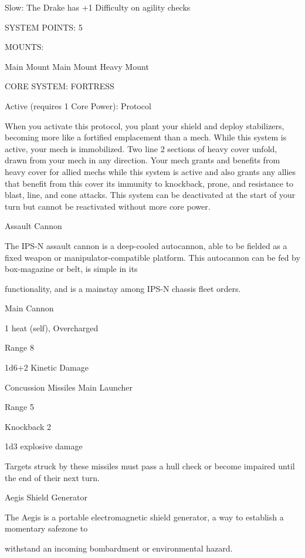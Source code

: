   Slow: The Drake has +1 Difficulty on agility checks

                                               SYSTEM POINTS: 5

                                                    MOUNTS:

  Main Mount                         Main Mount                              Heavy Mount

                                          CORE SYSTEM: FORTRESS

  Active (requires 1 Core Power):
  Protocol

  When you activate this protocol, you plant your shield and deploy stabilizers, becoming more like a
  fortified emplacement than a mech. While this system is active, your mech is immobilized. Two line 2
  sections of heavy cover unfold, drawn from your mech in any direction. Your mech grants and benefits
  from heavy cover for allied mechs while this system is active and also grants any allies that benefit from
  this cover its immunity to knockback, prone, and resistance to blast, line, and cone attacks. This
  system can be deactivated at the start of your turn but cannot be reactivated without more core power.

Assault Cannon

The IPS-N assault cannon is a deep-cooled autocannon, able to be fielded as a fixed weapon or
manipulator-compatible platform. This autocannon can be fed by box-magazine or belt, is simple in its

functionality, and is a mainstay among IPS-N chassis fleet orders.

Main Cannon

1 heat (self), Overcharged

Range 8

1d6+2 Kinetic Damage





Concussion Missiles
Main Launcher

Range 5

Knockback 2

1d3 explosive damage

Targets struck by these missiles must pass a hull check or become impaired until the end of their
next turn.


Aegis Shield Generator

The Aegis is a portable electromagnetic shield generator, a way to establish a momentary safezone to

withstand an incoming bombardment or environmental hazard.

